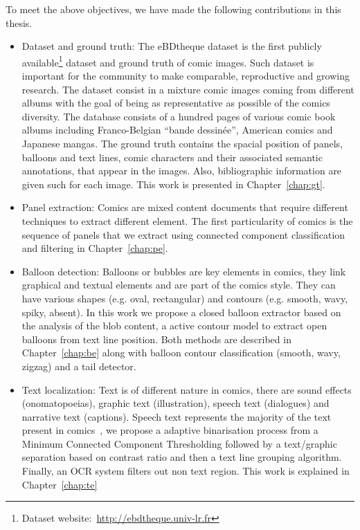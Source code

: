To meet the above objectives, we have made the following contributions in this
thesis.

\begin{itemize}
	\item[1)] Dataset and ground truth: The eBDtheque dataset is the first publicly available\footnote{Dataset website:~\url{http://ebdtheque.univ-lr.fr}} dataset and ground truth of comic images.
	Such dataset is important for the community to make comparable, reproductive and growing research.
	The dataset consist in a mixture comic images coming from different albums with the goal of being as representative as possible of the comics diversity.
	The database consists of a hundred pages of various comic book albums including Franco-Belgian ``bande dessinée'', American comics and Japanese mangas. 
	The ground truth contains the spacial position of panels, balloons and text lines, comic characters and their associated semantic annotations, that appear in the images.
	Also, bibliographic information are given such for each image.
	This work is presented in Chapter~\ref{chap:gt}.
	
	\item [2)] Panel extraction: Comics are mixed content documents that require different techniques to extract different element.
	The first particularity of comics is the sequence of panels that we extract using connected component classification and filtering in Chapter~\ref{chap:pe}.
	
	\item [3)] Balloon detection: Balloons or bubbles are key elements in comics,
	they link graphical and textual elements and are part of the comics style. They can have various shapes (e.g. oval, rectangular) and contours (e.g. smooth, wavy, spiky, absent).
	In this work we propose a closed balloon extractor based on the analysis of the blob content, a active contour model to extract open balloons from text line position.
	Both methods are described in Chapter~\ref{chap:be} along with balloon contour classification (smooth, wavy, zigzag) and a tail detector.

	\item [4)] Text localization: Text is of different nature in comics, there are sound effects (onomatopoeias), graphic text (illustration), speech text (dialogues) and narrative text (captions). 
	Speech text represents the majority of the text present in comics~\cite{??}, we propose a adaptive binarisation process from a Minimum Connected Component Thresholding followed by a text/graphic separation based on contrast ratio and then a text line grouping algorithm.
	Finally, an OCR system filters out non text region.
	This work is explained in Chapter~\ref{chap:te}


\end{itemize}
